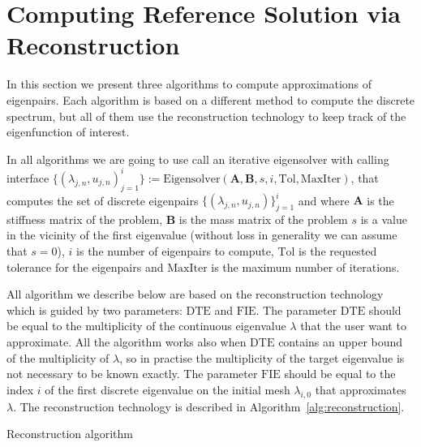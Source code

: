 \documentclass[preprint,12pt]{elsarticle}
\begin{document}
\section{Computing Reference Solution via Reconstruction}\label{sec:recoref}

In this section we present three algorithms to compute approximations of eigenpairs. Each algorithm is based on a different method to compute the discrete spectrum, but all of them use the reconstruction technology to keep track of the eigenfunction of interest.

In all algorithms we are going to use call an iterative eigensolver with calling interface
$\{(\lambda_{j,n},u_{j,n})_{j=1}^{i}\}:=\mathrm{Eigensolver}(\mathbf{A},\mathbf{B},s,i,\mathrm{Tol},\mathrm{MaxIter})$, that computes the set of discrete eigenpairs $\{(\lambda_{j,n},u_{j,n})\}_{j=1}^{i}$ and where $\mathbf{A}$ is the stiffness matrix of the problem, $\mathbf{B}$ is the mass matrix of the problem $s$ is a value in the vicinity of the first eigenvalue (without loss in generality we can assume that $s=0$), $i$ is the number of eigenpairs to compute, $\mathrm{Tol}$ is the requested tolerance for the eigenpairs and $\mathrm{MaxIter}$ is the maximum number of iterations. 


All algorithm we describe below are based on the reconstruction technology which is guided by two parameters: $\mathrm{DTE}$ and $\mathrm{FIE}$. The parameter $\mathrm{DTE}$ should be equal to the multiplicity of the continuous eigenvalue $\lambda$ that the user want to approximate. All the algorithm works also when $\mathrm{DTE}$ contains an upper bound of the multiplicity of $\lambda$, so in practise the multiplicity of the target eigenvalue is not necessary to be known exactly. The parameter $\mathrm{FIE}$ should be equal to the index $i$ of the first discrete eigenvalue on the initial mesh $\lambda_{i,0}$ that approximates $\lambda$. The reconstruction technology is described in Algorithm~\eqref{alg:reconstruction}.

\begin{algorithm}[H] \caption{Reconstruction algorithm} \label{alg:reconstruction} 
\begin{algorithmic}




\end{algorithmic}
\end{algorithm}
\end{document}
